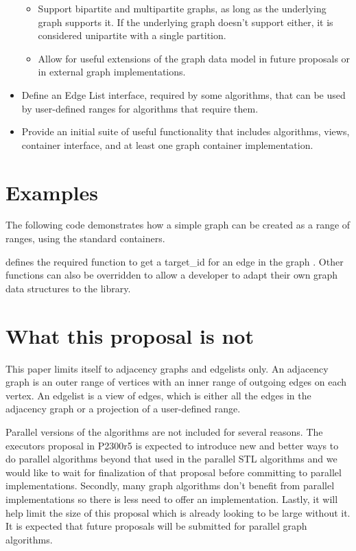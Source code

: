 \begin{itemize}
\begin{itemize}
    \item Support bipartite and multipartite graphs, as long as the underlying graph supports it. If the underlying graph doesn't support either,
          it is considered unipartite with a single partition.
    \item Allow for useful extensions of the graph data model in future proposals or in external graph implementations. 
  \end{itemize}
  \item Define an Edge List interface, required by some algorithms, that can be used by user-defined ranges for algorithms that require them.
  \item Provide an initial suite of useful functionality that includes algorithms, views, container interface, and at least one 
  graph container implementation.
\end{itemize}

\section{Examples}


The following code demonstrates how a simple graph can be created as a range of ranges, using the standard containers. 


{\small
  
}

 defines the required function to get a target\_id for an edge in the graph . Other functions can also
be overridden to allow a developer to adapt their own graph data structures to the library.

\section{What this proposal is  \textbf{not}}

This paper limits itself to adjacency graphs and edgelists only. An adjacency graph is an outer range of vertices with an inner range of outgoing
edges on each vertex. An edgelist is a view of edges, which is either all the edges in the adjacency graph or a projection of a user-defined range.

Parallel versions of the algorithms are not included for several reasons. The executors proposal in P2300r5 \cite{REF_P2300r5} is expected to introduce new 
and better ways to do parallel algorithms beyond that used in the parallel STL algorithms and we would like to wait for finalization of that proposal before 
committing to parallel implementations. Secondly, many graph algorithms don't benefit from parallel implementations so there is less need to offer an implementation. 
Lastly, it will help limit the size of this proposal which is already looking to be large without it. It is expected that future proposals will be submitted for parallel graph algorithms. 

